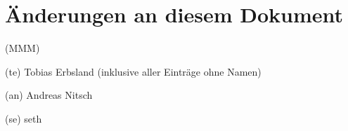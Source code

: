 %
%

\chapter{Änderungen an diesem Dokument}
\label{sec:aendeungen}

\begin{labeling}{(MMM)}
	\item[(te)] Tobias Erbsland (inklusive aller Einträge ohne Namen)
	\item[(an)] Andreas Nitsch
	\item[(se)] seth
\end{labeling}


